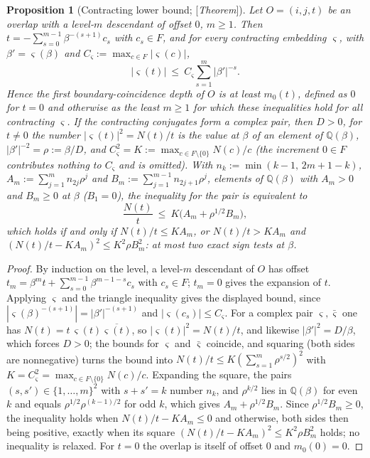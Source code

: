 \documentclass[11pt]{amsart}
\theoremstyle{plain}
\newtheorem{proposition}[theorem]{Proposition}
\theoremstyle{definition}
\theoremstyle{remark}
\newcommand{\Q}{\mathbb{Q}}
\newcommand{\Status}[1]{\textup{[\textit{#1}]}}
\begin{document}
\begin{proposition}[Contracting lower bound; \Status{Theorem}]\label{prop:contracting-bound}
Let $O=(i,j,t)$ be an overlap with a level-$m$ descendant of offset $0$, $m\ge1$. Then $t=-\sum_{s=0}^{m-1}\beta^{-(s+1)}c_s$ with $c_s\in F$, and for every contracting embedding $\varsigma$, with $\beta'=\varsigma(\beta)$ and $C_\varsigma:=\max_{c\in F}|\varsigma(c)|$,
\[
|\varsigma(t)|\ \le\ C_\varsigma\sum_{s=1}^{m}|\beta'|^{-s}.
\]
Hence the first boundary-coincidence depth of $O$ is at least $m_0(t)$, defined as $0$ for $t=0$ and otherwise as the least $m\ge1$ for which these inequalities hold for all contracting $\varsigma$. If the contracting conjugates form a complex pair, then $D>0$, for $t\ne0$ the number $|\varsigma(t)|^2=N(t)/t$ is the value at $\beta$ of an element of $\Q(\beta)$, $|\beta'|^{-2}=\rho:=\beta/D$, and $C_\varsigma^2=K:=\max_{c\in F\setminus\{0\}}N(c)/c$ (the increment $0\in F$ contributes nothing to $C_\varsigma$ and is omitted). With $n_k:=\min(k-1,\,2m+1-k)$, $A_m:=\sum_{j=1}^{m}n_{2j}\rho^{j}$ and $B_m:=\sum_{j=1}^{m-1}n_{2j+1}\rho^{j}$, elements of $\Q(\beta)$ with $A_m>0$ and $B_m\ge0$ at $\beta$ ($B_1=0$), the inequality for the pair is equivalent to
\[
\frac{N(t)}{t}\ \le\ K\bigl(A_m+\rho^{1/2}B_m\bigr),
\]
which holds if and only if $N(t)/t\le KA_m$, or $N(t)/t>KA_m$ and $(N(t)/t-KA_m)^2\le K^2\rho B_m^2$: at most two exact sign tests at $\beta$.
\end{proposition}
\begin{proof}
By induction on the level, a level-$m$ descendant of $O$ has offset $t_m=\beta^mt+\sum_{s=0}^{m-1}\beta^{m-1-s}c_s$ with $c_s\in F$; $t_m=0$ gives the expansion of $t$. Applying $\varsigma$ and the triangle inequality gives the displayed bound, since $|\varsigma(\beta)^{-(s+1)}|=|\beta'|^{-(s+1)}$ and $|\varsigma(c_s)|\le C_\varsigma$. For a complex pair $\varsigma,\bar\varsigma$ one has $N(t)=t\,\varsigma(t)\overline{\varsigma(t)}$, so $|\varsigma(t)|^2=N(t)/t$, and likewise $|\beta'|^2=D/\beta$, which forces $D>0$; the bounds for $\varsigma$ and $\bar\varsigma$ coincide, and squaring (both sides are nonnegative) turns the bound into $N(t)/t\le K(\sum_{s=1}^{m}\rho^{s/2})^2$ with $K=C_\varsigma^2=\max_{c\in F\setminus\{0\}}N(c)/c$. Expanding the square, the pairs $(s,s')\in\{1,\dots,m\}^2$ with $s+s'=k$ number $n_k$, and $\rho^{k/2}$ lies in $\Q(\beta)$ for even $k$ and equals $\rho^{1/2}\rho^{(k-1)/2}$ for odd $k$, which gives $A_m+\rho^{1/2}B_m$. Since $\rho^{1/2}B_m\ge0$, the inequality holds when $N(t)/t-KA_m\le0$ and otherwise, both sides then being positive, exactly when its square $(N(t)/t-KA_m)^2\le K^2\rho B_m^2$ holds; no inequality is relaxed. For $t=0$ the overlap is itself of offset $0$ and $m_0(0)=0$.
\end{proof}
\end{document}
